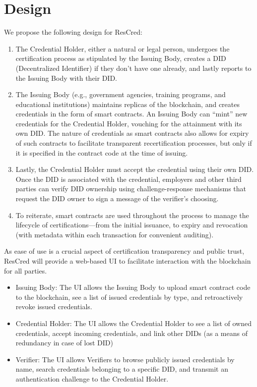 \section{Design}

We propose the following design for ResCred: 
\begin{enumerate}
    \item The Credential Holder, either a natural or legal person, undergoes the certification process as stipulated by the Issuing Body, creates a DID (Decentralized Identifier) if they don’t have one already, and lastly reports to the Issuing Body with their DID.
    \item The Issuing Body (e.g., government agencies, training programs, and educational institutions) maintains replicas of the blockchain, and creates credentials in the form of smart contracts. An Issuing Body can “mint” new credentials for the Credential Holder, vouching for the attainment with its own DID. The nature of credentials as smart contracts also allows for expiry of such contracts to facilitate transparent recertification processes, but only if it is specified in the contract code at the time of issuing.
    \item Lastly, the Credential Holder must accept the credential using their own DID. Once the DID is associated with the credential, employers and other third parties can verify DID ownership using challenge-response mechanisms that request the DID owner to sign a message of the verifier’s choosing.
    \item To reiterate, smart contracts are used throughout the process to manage the lifecycle of certifications—from the initial issuance, to expiry and revocation (with metadata within each transaction for convenient auditing).
\end{enumerate}

As ease of use is a crucial aspect of certification transparency and public trust, ResCred will provide a web-based UI to facilitate interaction with the blockchain for all parties.
\begin{itemize}
    \item Issuing Body: The UI allows the Issuing Body to upload smart contract code to the blockchain, see a list of issued credentials by type, and retroactively revoke issued credentials.
    \item Credential Holder: The UI allows the Credential Holder to see a list of owned credentials, accept incoming credentials, and link other DIDs (as a means of redundancy in case of lost DID)
    \item Verifier: The UI allows Verifiers to browse publicly issued credentials by name, search credentials belonging to a specific DID, and transmit an authentication challenge to the Credential Holder.
\end{itemize}


